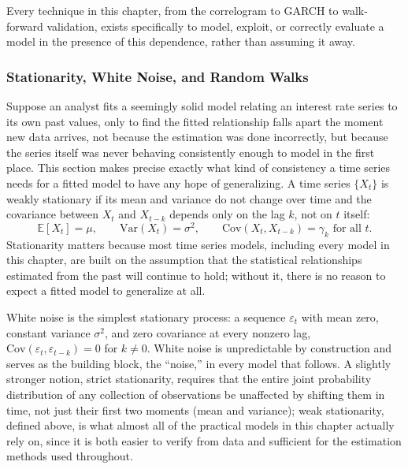 \documentclass[../ai_in_finance]{subfiles}
\begin{document}
Every technique in this chapter, from the correlogram to GARCH to walk-forward validation, exists specifically to model, exploit, or correctly evaluate a model in the presence of this dependence, rather than assuming it away.

\subsubsection*{Stationarity, White Noise, and Random Walks}
\label{sec:random-walk}

Suppose an analyst fits a seemingly solid model relating an interest rate series to its own past values, only to find the fitted relationship falls apart the moment new data arrives, not because the estimation was done incorrectly, but because the series itself was never behaving consistently enough to model in the first place. This section makes precise exactly what kind of consistency a time series needs for a fitted model to have any hope of generalizing. A time series $\{X_t\}$ is weakly stationary if its mean and variance do not change over time and the covariance between $X_t$ and $X_{t-k}$ depends only on the lag $k$, not on $t$ itself:
\begin{equation*}
\mathbb{E}[X_t] = \mu, \qquad \text{Var}(X_t) = \sigma^2, \qquad \text{Cov}(X_t, X_{t-k}) = \gamma_k \text{ for all } t.
\end{equation*}
Stationarity matters because most time series models, including every model in this chapter, are built on the assumption that the statistical relationships estimated from the past will continue to hold; without it, there is no reason to expect a fitted model to generalize at all.

White noise is the simplest stationary process: a sequence $\varepsilon_t$ with mean zero, constant variance $\sigma^2$, and zero covariance at every nonzero lag, $\text{Cov}(\varepsilon_t, \varepsilon_{t-k}) = 0$ for $k \ne 0$. White noise is unpredictable by construction and serves as the building block, the ``noise,'' in every model that follows.
A slightly stronger notion, strict stationarity, requires that the entire joint probability distribution of any collection of observations be unaffected by shifting them in time, not just their first two moments (mean and variance); weak stationarity, defined above, is what almost all of the practical models in this chapter actually rely on, since it is both easier to verify from data and sufficient for the estimation methods used throughout.
\end{document}
